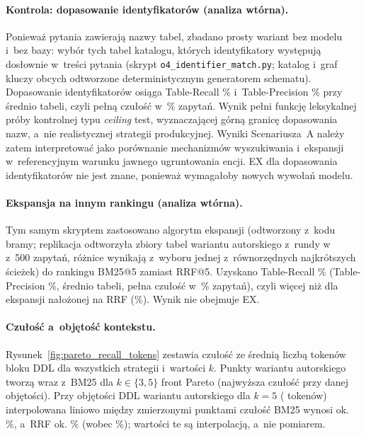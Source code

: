 \paragraph{Kontrola: dopasowanie identyfikatorów (analiza wtórna).} Ponieważ pytania zawierają nazwy tabel, zbadano prosty wariant bez modelu i~bez bazy: wybór tych tabel katalogu, których identyfikatory występują dosłownie w~treści pytania (skrypt \texttt{o4\_identifier\_match.py}; katalog i~graf kluczy obcych odtworzone deterministycznym generatorem schematu). Dopasowanie identyfikatorów osiąga Table-Recall \wynOfourImRecall\% i~Table-Precision \wynOfourImPrecision\% przy średnio \wynOfourImTables{} tabeli, czyli pełną czułość w~\wynOfourImFull\% zapytań. Wynik pełni funkcję leksykalnej próby kontrolnej typu \emph{ceiling} test, wyznaczającej górną granicę dopasowania nazw, a~nie realistycznej strategii produkcyjnej. Wyniki Scenariusza~A należy zatem interpretować jako porównanie mechanizmów wyszukiwania i~ekspansji w~referencyjnym warunku jawnego ugruntowania encji. EX dla dopasowania identyfikatorów nie jest znane, ponieważ wymagałoby nowych wywołań modelu.

\paragraph{Ekspansja na innym rankingu (analiza wtórna).} Tym samym skryptem zastosowano algorytm ekspansji (odtworzony z~kodu bramy; replikacja odtworzyła zbiory tabel wariantu autorskiego z~rundy w~\wynOfourReplica{} z~500 zapytań, różnice wynikają z~wyboru jednej z~równorzędnych najkrótszych ścieżek) do rankingu BM25@5 zamiast RRF@5. Uzyskano Table-Recall \wynOfourGobRecall\% (Table-Precision \wynOfourGobPrecision\%, średnio \wynOfourGobTables{} tabeli, pełna czułość w~\wynOfourGobFull\% zapytań), czyli więcej niż dla ekspansji nałożonej na RRF (\wynRecallGraphFive\%). Wynik nie obejmuje EX.

\paragraph{Czułość a~objętość kontekstu.} Rysunek~\ref{fig:pareto_recall_tokens} zestawia czułość ze średnią liczbą tokenów bloku DDL dla wszystkich strategii i~wartości $k$. Punkty wariantu autorskiego tworzą wraz z~BM25 dla $k \in \{3, 5\}$ front Pareto (najwyższa czułość przy danej objętości). Przy objętości DDL wariantu autorskiego dla $k = 5$ (\wynDdlGraphFive{} tokenów) interpolowana liniowo między zmierzonymi punktami czułość BM25 wynosi ok. \wynOthreeInterpBm\%, a~RRF ok. \wynOthreeInterpRrf\% (wobec \wynRecallGraphFive\%); wartości te są interpolacją, a~nie pomiarem.

